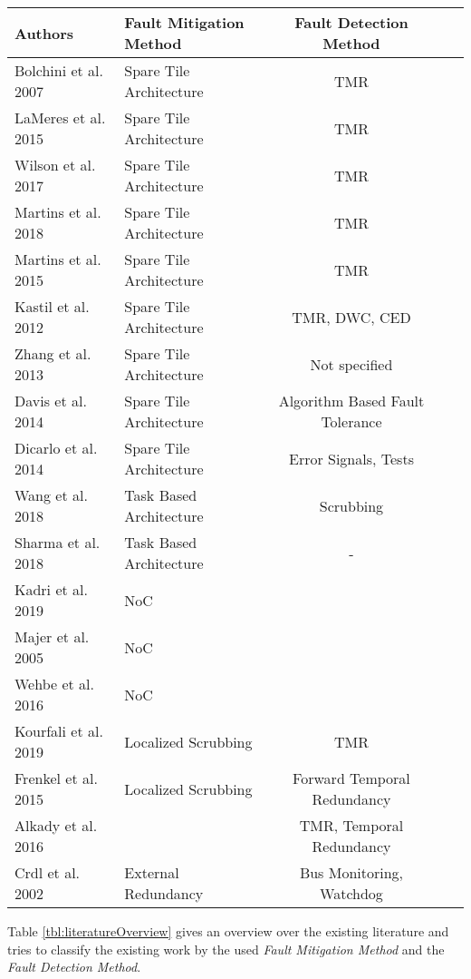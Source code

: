 \begin{table*}
    \caption{Literature on the usage of \gls{DPR} for fault-tolerance.}
    \label{tbl:literatureOverview}
    \begin{tabular*}{\textwidth}{@{\extracolsep{\fill}}llccc}
        \toprule
       \textbf{Authors} & \textbf{Fault Mitigation Method} & \textbf{Fault Detection Method} \\
       \midrule
       \cite{bolchini2007} Bolchini et al. 2007             & Spare Tile Architecture      & TMR  \\
       \cite{lameres_radsat_2015} LaMeres et al. 2015       & Spare Tile Architecture      & TMR  \\
       \cite{wilson_hybrid_2017} Wilson et al. 2017         & Spare Tile Architecture      & TMR  \\
       \cite{martins_dynamic_2018} Martins et al. 2018      & Spare Tile Architecture      & TMR  \\
       \cite{martins_tmr_2015} Martins et al. 2015          & Spare Tile Architecture      & TMR  \\
       \cite{kastil2012} Kastil et al. 2012                 & Spare Tile Architecture      & TMR, DWC, CED  \\
       \cite{zhang2013} Zhang et al. 2013                   & Spare Tile Architecture      & Not specified \\
       \cite{davis2014} Davis et al. 2014                   & Spare Tile Architecture      & Algorithm Based Fault Tolerance \\
       \cite{dicarlo2014} Dicarlo et al. 2014               & Spare Tile Architecture      & Error Signals, Tests \\
       \cite{wang_dynamic_2018} Wang et al. 2018            & Task Based Architecture      & Scrubbing \\
       \cite{sharma_run-time_2018} Sharma et al. 2018       & Task Based Architecture      & - \\
       \cite{kadri_survey_2019} Kadri et al. 2019           & NoC                          & \\
       \cite{majer_packet_2005} Majer et al. 2005           & NoC                          & \\
       \cite{wehbe_secure_2016} Wehbe et al. 2016           & NoC                          & \\
       \cite{kourfali2019} Kourfali et al. 2019             & Localized Scrubbing           & TMR \\
       \cite{frenkel2015} Frenkel et al. 2015               & Localized Scrubbing       & Forward Temporal Redundancy \\
       \cite{alkady_integration_2016} Alkady et al. 2016             &              & TMR, Temporal Redundancy \\
       \cite{crdl_fail-safe_2002} Crdl et al. 2002          & External Redundancy           & Bus Monitoring, Watchdog \\
       \bottomrule
    \end{tabular*}
\end{table*}

Table \ref{tbl:literatureOverview} gives an overview over the existing literature and tries to classify the existing work by the used \textit{Fault Mitigation Method} and the \textit{Fault Detection Method}. 
